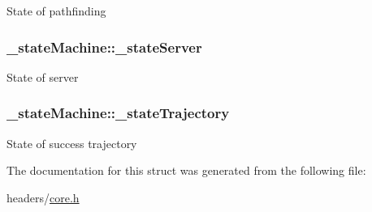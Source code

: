 State of pathfinding \hypertarget{struct__state_machine_aaee24e4ab99a6f1243a46645188de8d0}{
\subsubsection[{\-\_\-state\-Server}]{ \-\_\-state\-Machine\-::\-\_\-state\-Server}}\label{struct__state_machine_aaee24e4ab99a6f1243a46645188de8d0}
State of server \hypertarget{struct__state_machine_a88c6e0c15cdd29b3eec2e842fa09b08f}{
\subsubsection[{\-\_\-state\-Trajectory}]{ \-\_\-state\-Machine\-::\-\_\-state\-Trajectory}}\label{struct__state_machine_a88c6e0c15cdd29b3eec2e842fa09b08f}
State of success trajectory 

The documentation for this struct was generated from the following file\-:\begin{DoxyCompactItemize}
\item 
headers/\hyperlink{core_8h}{core.\-h}\end{DoxyCompactItemize}

